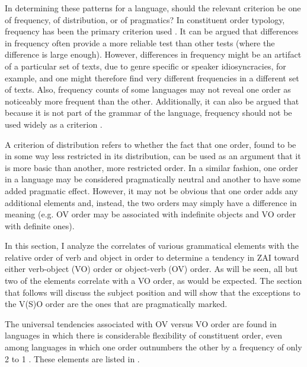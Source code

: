 In determining these patterns for a language, should the relevant criterion be one of frequency, of distribution, or of pragmatics? In constituent order typology, frequency has been the primary criterion used \citep{dryer2007}. It can be argued that differences in frequency often provide a more reliable test than other tests (where the difference is large enough). However, differences in frequency might be an artifact of a particular set of texts, due to genre specific or speaker idiosyncracies, for example, and one might therefore find very different frequencies in a different set of texts. Also, frequency counts of some languages may not reveal one order as noticeably more frequent than the other. Additionally, it can also be argued that because it is not part of the grammar of the language, frequency should not be used widely as a criterion \citep{dryer2007}.

A criterion of distribution refers to whether the fact that one order, found to be in some way less restricted in its distribution, can be used as an argument that it is more basic than another, more restricted order. In a similar fashion, one order in a language may be considered pragmatically neutral and another to have some added pragmatic effect. However, it may not be obvious that one order adds any additional elements and, instead, the two orders may simply have a difference in meaning (e.g. OV order may be associated with indefinite objects and VO order with definite ones). 


In this section, I analyze the correlates of various grammatical elements with the relative order of verb and object in order to determine a tendency in ZAI toward either verb-object (VO) order or object-verb (OV) order. As will be seen, all but two of the elements correlate with a VO order, as would be expected. The section that follows will discuss the subject position and will show that the exceptions to the V(S)O order are the ones that are pragmatically marked.

The universal tendencies associated with OV versus VO order are found in languages in which there is considerable flexibility of constituent order, even among languages in which one order outnumbers the other by a frequency of only 2 to 1 \citep{dryer2007}. These elements are listed in .

